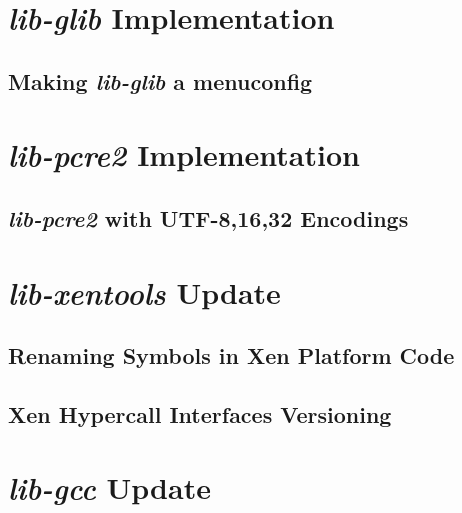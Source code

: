 \section{\textit{lib-glib} Implementation}
\label{sec:lib-glib-impl}

\subsection{Making \textit{lib-glib} a menuconfig}
\label{subsec:glib-menuconfig}


\section{\textit{lib-pcre2} Implementation}
\label{sec:lib-pcre2-impl}

\subsection{\textit{lib-pcre2} with UTF-8,16,32 Encodings}
\label{subsec:pcre2-menuconfig}


\section{\textit{lib-xentools} Update}
\label{sec:lib-xentools-update}

\subsection{Renaming Symbols in Xen Platform Code}
\label{subsec:xen-renaming-symbols}

\subsection{Xen Hypercall Interfaces Versioning}
\label{subsec:xen-interface-versioning}

\section{\textit{lib-gcc} Update}
\label{sec:lib-gcc-update}
